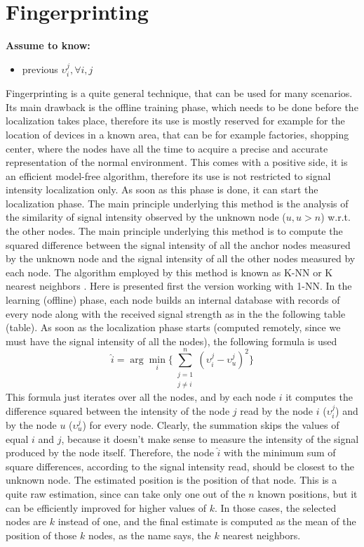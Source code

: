 \documentclass[12pt]{report}
\begin{document}
\section{Fingerprinting}
  \begin{center}
  \textbf{Assume to know:}
  \begin{itemize}
    \centering
    \item previous $\upsilon_i^j,\forall i,j$
  \end{itemize}
  \end{center}
Fingerprinting \cite{YIU2017235} is a quite general technique, that can be used for many scenarios. Its main drawback is the offline training phase, which needs to be done before the localization takes place, therefore its use is mostly reserved for example for the location of devices in a known area, that can be for example factories, shopping center, where the nodes have all the time to acquire a precise and accurate representation of the normal environment. This comes with a positive side, it is an efficient model-free algorithm, therefore its use is not restricted to signal intensity localization only. As soon as this phase is done, it can start the localization phase. The main principle underlying this method is the analysis of the similarity of signal intensity observed by the unknown node ($u,u>n$) w.r.t. the other nodes. The main principle underlying this method is to compute the squared difference between the signal intensity of all the anchor nodes measured by the unknown node and the signal intensity of all the other nodes measured by each node.
The algorithm employed by this method is known as K-NN or K nearest neighbors \cite{10.5555/1162264}. Here is presented first the version working with 1-NN.
In the learning (offline) phase, each node builds an internal database with records of every node along with the received signal strength as in the the following table (table). As soon as the localization phase starts (computed remotely, since we must have the signal intensity of all the nodes), the following formula is used
\begin{equation}
    \hat{i}=\arg \min_i\bigg\{\sum_{\substack{j=1\\j\neq i}}^n(\upsilon_i^j-\upsilon_{u}^j)^2\bigg\}
\end{equation}
This formula just iterates over all the nodes, and by each node $i$ it computes the difference squared between the intensity of the node $j$ read by the node $i$ ($\upsilon_i^j$) and by the node $u$ ($\upsilon_u^j$) for every node. Clearly, the summation skips the values of equal $i$ and $j$, because it doesn't make sense to measure the intensity of the signal produced by the node itself. Therefore, the node $\hat{i}$ with the minimum sum of square differences, according to the signal intensity read, should be closest to the unknown node. The estimated position is the position of that node. This is a quite raw estimation, since can take only one out of the $n$ known positions, but it can be efficiently improved for higher values of $k$. In those cases, the selected nodes are $k$ instead of one, and the final estimate is computed as the mean of the position of those $k$ nodes, as the name says, the $k$ nearest neighbors.
\end{document}
